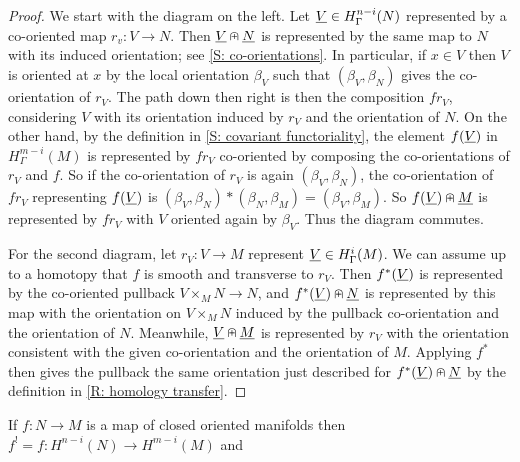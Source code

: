 \begin{proof}
	We start with the diagram on the left.
	Let $\underline{V} \in H^{n-i}_\Gamma(N)$ represented by a co-oriented map $r_v \colon V \to N$.
	Then $\underline{V}\nplus\underline{N}$ is represented by the same map to $N$ with its induced orientation; see \cref{S: co-orientations}.
	In particular, if $x \in V$ then $V$ is oriented at $x$ by the local orientation $\beta_V$ such that $(\beta_V,\beta_N)$ gives the co-orientation of $r_V$.
	The path down then right is then the composition $fr_V$, considering $V$ with its orientation induced by $r_V$ and the orientation of $N$.
	On the other hand, by the definition in \cref{S: covariant functoriality}, the element $f(\underline{V})$ in $H^{m-i}_\Gamma(M)$ is represented by $fr_V$ co-oriented by composing the co-orientations of $r_V$ and $f$.
	So if the co-orientation of $r_V$ is again $(\beta_V,\beta_N)$, the co-orientation of $fr_V$ representing $f(\underline{V})$ is $(\beta_V,\beta_N)*(\beta_N,\beta_M) = (\beta_V,\beta_M)$.
	So $f(\underline{V})\nplus \underline{M}$ is represented by $fr_V$ with $V$ oriented again by $\beta_V$.
	Thus the diagram commutes.

	For the second diagram, let $r_V \colon V \to M$ represent $\underline{V} \in H^{i}_\Gamma(M)$.
	We can assume up to a homotopy that $f$ is smooth and transverse to $r_V$.
	Then $f^*(\underline{V})$ is represented by the co-oriented pullback $V \times_M N \to N$, and $f^*(\underline{V})\nplus\underline{N}$ is represented by this map with the orientation on $V \times_M N$ induced by the pullback co-orientation and the orientation of $N$.
	Meanwhile, $\underline{V}\nplus \underline{M}$ is represented by $r_V$ with the orientation consistent with the given co-orientation and the orientation of $M$.
	Applying $f^*$ then gives the pullback the same orientation just described for $f^*(\underline{V})\nplus\underline{N}$ by the definition in \cref{R: homology transfer}.
\end{proof}

\begin{corollary}
	If $f \colon N \to M$ is a map of closed oriented manifolds then
	$f^! = f:H^{n-i}(N) \to H^{m-i}(M)$ and
\end{corollary}

